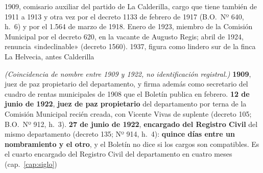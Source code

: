 \begin{personas}
\item[{\textbf{Genaro Molina\index{Molina, Genaro}}}] 1909, comisario auxiliar del partido de La Calderilla, cargo que tiene también de 1911 a 1913 y otra vez por el decreto 1133 de febrero de 1917 (B.O.\ Nº 640, h.\ 6) y por el 1.564 de marzo de 1918. Enero de 1923, miembro de la Comisión Municipal por el decreto 620, en la vacante de Augusto Regis; abril de 1924, renuncia «indeclinable» (decreto 1560). 1937, figura como lindero sur de la finca La Helvecia, antes Calderilla

\item[{\textbf{Carlos F.\ Matienzo\index{Matienzo, Carlos}}}] \textit{(Coincidencia de nombre entre 1909 y 1922, no identificación registral.)} \textbf{1909}, juez de paz propietario del departamento, y firma además como secretario del cuadro de rentas municipales de 1908 que el Boletín publica en febrero. \textbf{12 de junio de 1922}, \textbf{juez de paz propietario} del departamento por terna de la Comisión Municipal recién creada, con Vicente Vivas de suplente (decreto 105; B.O.\ Nº 912, h.\ 3). \textbf{27 de junio de 1922}, \textbf{encargado del Registro Civil} del mismo departamento (decreto 135; Nº 914, h.\ 4): \textbf{quince días entre un nombramiento y el otro}, y el Boletín no dice si los cargos son compatibles. Es el cuarto encargado del Registro Civil del departamento en cuatro meses (cap.\ \ref{cap:siglo})


\end{personas}

